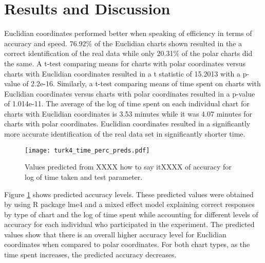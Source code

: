 \section{Results and Discussion}

Euclidian coordinates performed better when speaking of efficiency in terms of accuracy and speed. 76.92\% of the Euclidian charts shown resulted in the a correct identification of the real data while only 20.31\% of the polar charts did the same. A t-test comparing means for charts with polar coordinates versus charts with Euclidian coordinates resulted in a t statistic of 15.2013 with a p-value of 2.2e-16. Similarly, a t-test comparing means of time spent on charts with Euclidian coordinates versus charts with polar coordinates resulted in a p-value of 1.014e-11. The average of the log of time spent on each individual chart for charts with Euclidian coordinates is 3.53 minutes while it was 4.07 minutes for charts with polar coordinates. Euclidian coordinates resulted in a significantly more accurate identification of the real data set in significantly shorter time. 

\begin{figure}[htbp] %
   \centering
   \texttt{[image: turk4\_time\_perc\_preds.pdf]}  
   \caption{Values predicted from XXXX how to say itXXXX of accuracy for log of time taken and test parameter.}
   \label{accuracy_preds}
\end{figure}

Figure \ref{accuracy_preds} shows predicted accuracy levels. These predicted values were obtained by using R package lme4 and a mixed effect model explaining correct responses by type of chart and the log of time spent while accounting for different levels of accuracy for each individual who participated in the experiment. The predicted values show that there is an overall higher accuracy level for Euclidian coordinates when compared to polar coordinates. For both chart types, as the time spent increases, the predicted accuracy decreases. 



